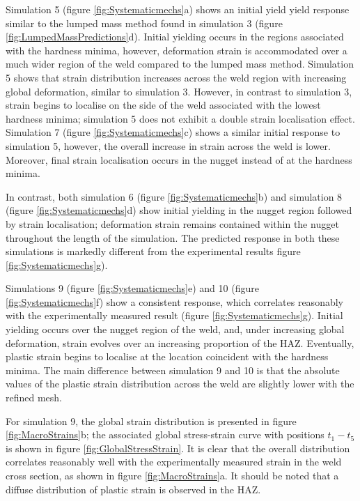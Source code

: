 Simulation 5 (figure \ref{fig:Systematicmechs}a) shows an initial yield yield response similar to the lumped mass method found in simulation 3 (figure \ref{fig:LumpedMassPredictions}d). Initial yielding occurs in the regions associated with the hardness minima, however, deformation strain is accommodated over a much wider region of the weld compared to the lumped mass method. Simulation 5 shows that strain distribution increases across the weld region with increasing global deformation, similar to simulation 3. However, in contrast to simulation 3, strain begins to localise on the side of the weld associated with the lowest hardness minima; simulation 5 does not exhibit a double strain localisation effect. Simulation 7 (figure \ref{fig:Systematicmechs}c) shows a similar initial response to simulation 5, however, the overall increase in strain across the weld is lower. Moreover, final strain localisation occurs in the nugget instead of at the hardness minima. 

In contrast, both simulation 6 (figure \ref{fig:Systematicmechs}b) and simulation 8 (figure \ref{fig:Systematicmechs}d) show initial yielding in the nugget region followed by strain localisation; deformation strain remains contained within the nugget throughout the length of the simulation. The predicted response in both these simulations is markedly different from the experimental results figure \ref{fig:Systematicmechs}g). 

Simulations 9 (figure \ref{fig:Systematicmechs}e) and 10 (figure \ref{fig:Systematicmechs}f) show a consistent response, which correlates reasonably with the experimentally measured result (figure \ref{fig:Systematicmechs}g). Initial yielding occurs over the nugget region of the weld, and, under increasing global deformation, strain evolves over an increasing proportion of the HAZ. Eventually, plastic strain begins to localise at the location coincident with the hardness minima. The main difference between simulation 9 and 10 is that the absolute values of the plastic strain distribution across the weld are slightly lower with the refined mesh.

For simulation 9, the global strain distribution is presented in figure \ref{fig:MacroStrains}b; the associated global stress-strain curve with positions $t_1 - t_5$ is shown in figure \ref{fig:GlobalStressStrain}. It is clear that the overall distribution correlates reasonably well with the experimentally measured strain in the weld cross section, as shown in figure \ref{fig:MacroStrains}a. It should be noted that a diffuse distribution of plastic strain is observed in the HAZ. 


